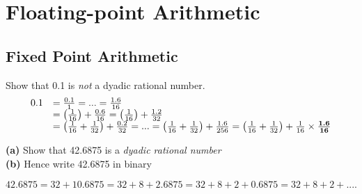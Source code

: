 

\chapter{Floating-point Arithmetic}


\section{Fixed Point Arithmetic}

\begin{figure}[h]
\end{figure}

\frmrule

\begin{example}
Show that 0.1 is \textit{not} a dyadic rational number.
\[ 
\begin{array}{ll}
0.1 & = \frac{0.1}{1} = ... = \frac{1.6}{16} \\
    & = \left(\frac{1}{16}\right) + \frac{0.6}{16} = \left(\frac{1}{16}\right) + \frac{1.2}{32} \\
    & = \left(\frac{1}{16} + \frac{1}{32}\right) + \frac{0.2}{32} = ... = 
    \left(\frac{1}{16} + \frac{1}{32}\right) + \frac{1.6}{256} = 
    \left(\frac{1}{16} + \frac{1}{32}\right) + \frac{1}{16} \times \frac{\text{\textbf{1.6}}}{\textbf{16}}
\end{array}
\] 


\end{example}

\begin{example}
\textbf{(a)} Show that 42.6875 is a \textit{dyadic rational number} \\
\textbf{(b)} Hence write 42.6875 in binary

$42.6875 = 32 + 10.6875 = 32 + 8 + 2.6875 = 32 + 8 + 2 + 0.6875 = 32 + 8 + 2 + ....$
\end{example}


